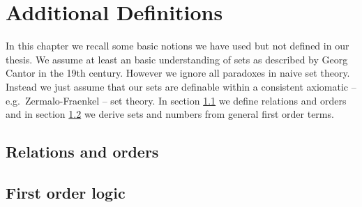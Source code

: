 
\chapter{Additional Definitions}



In this chapter we recall some basic notions we have used but not defined in our thesis.
We assume at least an {\myem basic} understanding of sets as described by Georg Cantor in the 19th century. 
However we ignore all paradoxes in {\myem naive} set theory.
Instead we just assume that our sets are definable within a consistent axiomatic 
-- e.g.~Zermalo-Fraenkel -- set theory.
In section \ref{sec:app:maths} we define relations and orders and in
section \ref{sec:app:fol} we derive sets and numbers from general first order terms.

\section{Relations and orders}\label{sec:app:maths}



\section{First order logic}\label{sec:app:fol}





